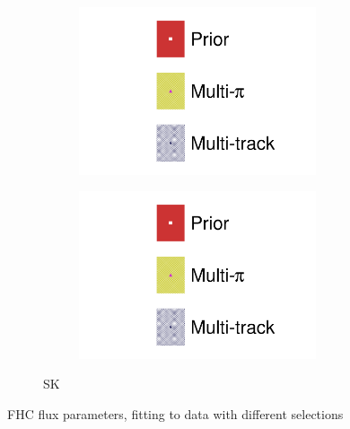 \begin{figure}[h]
\begin{subfigure}[t]{\textwidth}
\begin{subfigure}[t]{0.24\textwidth}
	\includegraphics[width=\textwidth,page=12, trim={0mm 0mm 0mm 9mm}, clip]{figures/mach3/2018/data/2018a_FixedCov_RedCov_Mpi_Data_merg_2018a_NewDetMatrix_OrderSwitched_Data2to8_ActualData_merge}
\end{subfigure}
\begin{subfigure}[t]{0.24\textwidth}
	\includegraphics[width=\textwidth,page=13, trim={0mm 0mm 0mm 9mm}, clip]{figures/mach3/2018/data/2018a_FixedCov_RedCov_Mpi_Data_merg_2018a_NewDetMatrix_OrderSwitched_Data2to8_ActualData_merge}
\end{subfigure}
\caption{SK}
\end{subfigure}
	
	\caption{FHC flux parameters, fitting to data with different selections}
	\label{fig:data_multitrack_multipi_fhc}
\end{figure}

